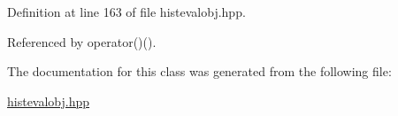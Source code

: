 \-Definition at line 163 of file histevalobj.\-hpp.



\-Referenced by operator()().



\-The documentation for this class was generated from the following file\-:\begin{DoxyCompactItemize}
\item 
\hyperlink{histevalobj_8hpp}{histevalobj.\-hpp}\end{DoxyCompactItemize}
